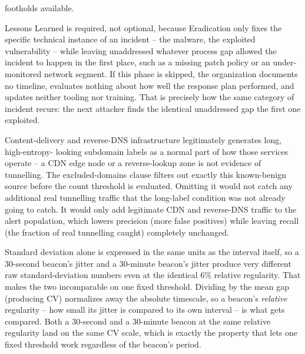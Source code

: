 \begin{answerkey}
footholds available.
\item Lessons Learned is required, not optional, because Eradication only fixes the specific
technical instance of an incident -- the malware, the exploited vulnerability -- while leaving
unaddressed whatever process gap allowed the incident to happen in the first place, such as a
missing patch policy or an under-monitored network segment. If this phase is skipped, the
organization documents no timeline, evaluates nothing about how well the response plan performed,
and updates neither tooling nor training. That is precisely how the same category of incident
recurs: the next attacker finds the identical unaddressed gap the first one exploited.
\item Content-delivery and reverse-DNS infrastructure legitimately generates long, high-entropy-
looking subdomain labels as a normal part of how those services operate -- a CDN edge node or a
reverse-lookup zone is not evidence of tunnelling. The excluded-domains clause filters out exactly
this known-benign source before the count threshold is evaluated. Omitting it would not catch any
additional real tunnelling traffic that the long-label condition was not already going to catch.
It would only add legitimate CDN and reverse-DNS traffic to the alert population, which lowers
precision (more false positives) while leaving recall (the fraction of real tunnelling caught)
completely unchanged.
\item Standard deviation alone is expressed in the same units as the interval itself, so a
30-second beacon's jitter and a 30-minute beacon's jitter produce very different raw
standard-deviation numbers even at the identical 6\% relative regularity. That makes the two
incomparable on one fixed threshold. Dividing by the mean gap (producing CV) normalizes away the
absolute timescale, so a beacon's \emph{relative} regularity -- how small its jitter is compared to
its own interval -- is what gets compared. Both a 30-second and a 30-minute beacon at the same
relative regularity land on the same CV scale, which is exactly the property that lets one fixed
threshold work regardless of the beacon's period.
\end{answerkey}

